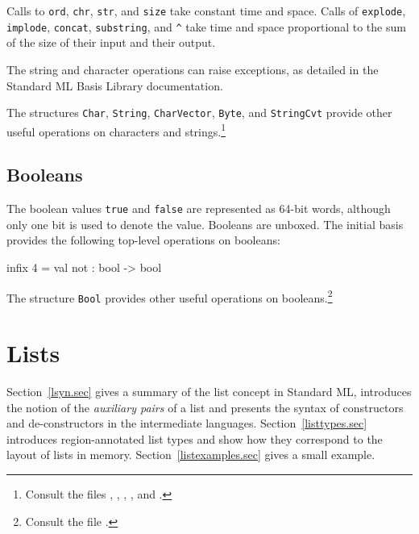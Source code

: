 \documentclass[12pt]{book}
\begin{document}
Calls to \lstinline{ord}, \lstinline{chr}, \lstinline{str}, and \lstinline{size}
take constant time and space.  Calls of \lstinline{explode},
\lstinline{implode}, \lstinline{concat}, \lstinline{substring}, and
\lstinline!^! take time and space proportional to the sum of the size of their
input and their output.

The string and character operations can raise exceptions, as detailed in the
Standard ML Basis Library documentation.

The structures \lstinline{Char}, \lstinline{String}, \lstinline{CharVector},
\lstinline{Byte}, and \lstinline{StringCvt} provide other useful operations on
characters and strings.\footnote{Consult the files ,
, ,
, and .}

\section{Booleans}

The boolean values \lstinline{true} and \lstinline{false} are represented as
64-bit words, although only one bit is used to denote the value.  Booleans are
unboxed. The
%
%
initial basis provides the following top-level operations on booleans:
%
%
%
\begin{smlcode}
  infix   4 =
  val not : bool -> bool
\end{smlcode}

\noindent
The structure \lstinline{Bool} provides other useful operations on
booleans.\footnote{Consult the file .}

\chapter{Lists}
\label{lists.sec}

Section~\ref{lsyn.sec} gives a summary of the list concept in Standard ML,
introduces the notion of the \emph{auxiliary pairs} of a list and presents the
syntax of constructors and de-constructors in the intermediate languages.
Section~\ref{listtypes.sec} introduces region-annotated list types and show how
they correspond to the layout of lists in memory.
Section~\ref{listexamples.sec} gives a small example.
\end{document}
